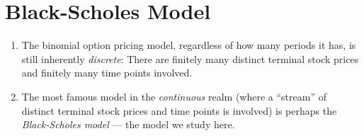 \section{Black-Scholes Model}
\label{sect:bs-model}
\begin{enumerate}
\item The binomial option pricing model, regardless of how many periods it has,
is still inherently \emph{discrete}: There are finitely many distinct terminal
stock prices and finitely many time points involved.

\item The most famous model in the \emph{continuous} realm (where a ``stream''
of distinct terminal stock prices and time points is involved) is perhaps the
\emph{Black-Scholes model} --- the model we study here.
\end{enumerate}
